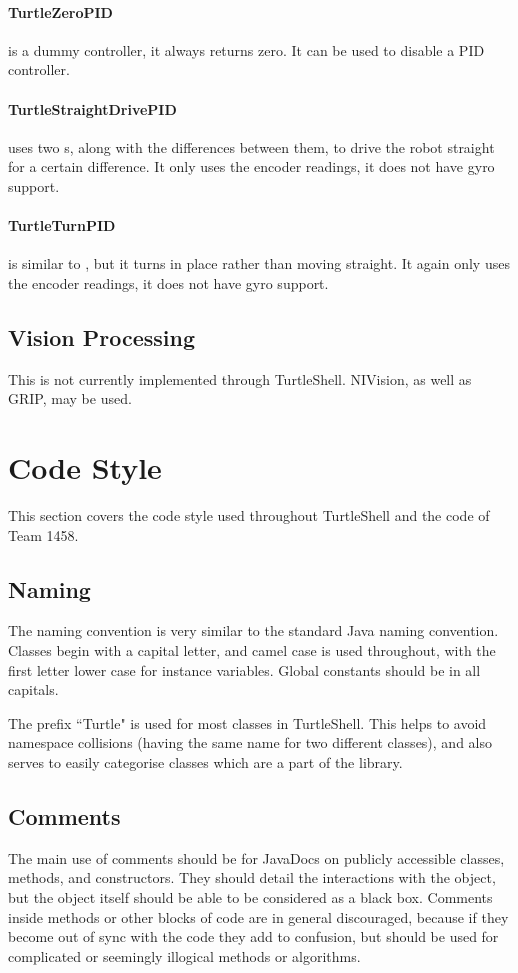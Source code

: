\documentclass[]{report}
\begin{document}
\paragraph{TurtleZeroPID}
 is a dummy controller, it always returns zero.
It can be used to disable a PID controller.

\paragraph{TurtleStraightDrivePID}
 uses two s, along with the differences between them, to drive the robot straight for a certain difference.
It only uses the encoder readings, it does not have gyro support.

\paragraph{TurtleTurnPID}
 is similar to , but it turns in place rather than moving straight.
It again only uses the encoder readings, it does not have gyro support.


\subsection{Vision Processing}
This is not currently implemented through TurtleShell.
NIVision, as well as GRIP, may be used.


\section{Code Style}
This section covers the code style used throughout TurtleShell and the code of Team 1458.

\subsection{Naming}
The naming convention is very similar to the standard Java naming convention.
Classes begin with a capital letter, and camel case is used throughout, with the first letter lower case for instance variables.
Global constants should be in all capitals.

The prefix ``Turtle" is used for most classes in TurtleShell.
This helps to avoid namespace collisions (having the same name for two different classes), and also serves to easily categorise classes which are a part of the library.

\subsection{Comments}
The main use of comments should be for JavaDocs on publicly accessible classes, methods, and constructors.
They should detail the interactions with the object, but the object itself should be able to be considered as a black box.
Comments inside methods or other blocks of code are in general discouraged, because if they become out of sync with the code they add to confusion, but should be used for complicated or seemingly illogical methods or algorithms.
\end{document}
